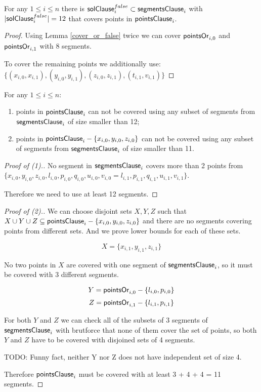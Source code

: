 \begin{lemma}
\label{cover_clauses_solution_false}
For any $1 \le i \le n$ there is
$\mathsf{solClause}^{false}_i \subset \mathsf{segmentsClause}_i$
with $|\mathsf{solClause}^{false}_i| = 12$
that covers points in $\mathsf{pointsClause}_i$.
\end{lemma}

\begin{proof}
Using Lemma \ref{cover_or_false} twice we can
cover $\mathsf{pointsOr}_{i,0}$ and  $\mathsf{pointsOr}_{i,1}$
with 8 segments.

To cover the remaining points we additionally use:
$\{ (x_{i, 0}, x_{i, 1}), (y_{i, 0}, y_{i, 1}),
(z_{i, 0}, z_{i, 1}), (t_{i, 1}, v_{i, 1}) \}$
\end{proof}

\begin{lemma}
\label{cover_clauses_segments_no_less}
For any $1 \le i \le n$:
\begin{enumerate}[label={(\arabic*)}]
	\item points in $\mathsf{pointsClause}_i$ can not be covered 
	using any subset of segments
	from $\mathsf{segmentsClause}_i$ of size smaller than 12;
	\item points in $\mathsf{pointsClause}_i - \{ x_{i, 0}, y_{i, 0}, z_{i, 0}\}$
	can not be covered using any subset of segments
	from $\mathsf{segmentsClause}_i$ of size smaller than 11.
\end{enumerate}
\end{lemma}


\begin{proof}[Proof of (1).]
No segment in $\mathsf{segmentsClause}_i$ covers more than 2 points from
$\{ x_{i, 0}, y_{i, 0}, z_{i, 0}, l_{i, 0}, p_{i, 0}, q_{i, 0},
u_{i, 0}, v_{i, 0} = l_{i, 1}, p_{i, 1}, q_{i, 1}, u_{i, 1}, v_{i, 1} \}$.

Therefore we need to use at least 12 segments.
\end{proof}

\begin{proof}[Proof of (2).]

We can choose disjoint sets $X, Y, Z$ such that
$X \cup Y \cup Z \subseteq \mathsf{pointsClause}_i - \{x_{i, 0}, y_{i, 0}, z_{i, 0}\}$
and there are no segments covering points from different sets.
And we prove lower bounds for each of these sets.

$$X = \{x_{i, 1}, y_{i, 1}, z_{i, 1}\}$$

No two points in $X$ are covered with one segment
of $\mathsf{segmentsClause}_i$, so it must be covered with 3 different segments.

$$Y = \mathsf{pointsOr}_{i,0} - \{l_{i, 0}, p_{i, 0}\}$$
$$Z = \mathsf{pointsOr}_{i,1} - \{l_{i, 1}, p_{i, 1}\}$$


For both $Y$ and $Z$ we can check all of the subsets of 3 segments
of $\mathsf{segmentsClause}_i$
with brutforce that none of them cover the set of points,
so both $Y$ and $Z$ have to be covered with 
disjoined sets of 4 segments.

TODO: Funny fact, neither Y nor Z does not have independent set of size 4.

Therefore $\mathsf{pointsClause}_i$ must be covered with at least 3 + 4 + 4 = 11 segments.
\end{proof}

